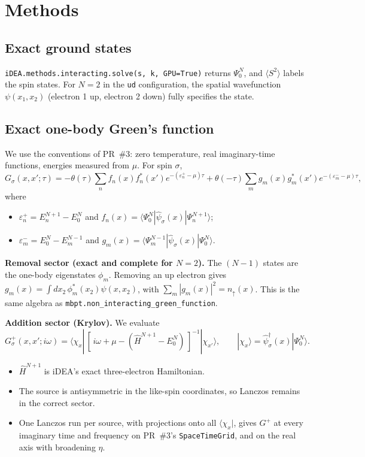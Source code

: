 \documentclass[11pt,a4paper]{article}
\newcommand{\iDEA}{iDEA}
\newcommand{\code}[1]{\texttt{#1}}
\begin{document}
\section{Methods}

\subsection{Exact ground states}
\code{iDEA.methods.interacting.solve(s, k, GPU=True)} returns $\Psi_0^N$, and $\langle S^2\rangle$ labels the spin states. For $N=2$ in the \code{ud} configuration, the spatial wavefunction $\psi(x_1,x_2)$ (electron 1 up, electron 2 down) fully specifies the state.

\subsection{Exact one-body Green's function}
We use the conventions of PR~\#3: zero temperature, real imaginary-time functions, energies measured from $\mu$. For spin $\sigma$,
\begin{equation}
G_\sigma(x,x';\tau)=-\theta(\tau)\sum_n f_n(x)f_n^*(x')e^{-(\varepsilon_n^+-\mu)\tau}+\theta(-\tau)\sum_m g_m(x)g_m^*(x')e^{-(\varepsilon_m^--\mu)\tau},
\end{equation}
where
\begin{itemize}
\item $\varepsilon_n^+=E_n^{N+1}-E_0^N$ and $f_n(x)=\langle\Psi_0^N|\hat\psi_\sigma(x)|\Psi_n^{N+1}\rangle$;
\item $\varepsilon_m^-=E_0^N-E_m^{N-1}$ and $g_m(x)=\langle\Psi_m^{N-1}|\hat\psi_\sigma(x)|\Psi_0^N\rangle$.
\end{itemize}

\textbf{Removal sector (exact and complete for $N=2$).} The $(N-1)$ states are the one-body eigenstates $\phi_m$. Removing an up electron gives $g_m(x)=\int dx_2\,\phi_m^*(x_2)\psi(x,x_2)$, with $\sum_m|g_m(x)|^2=n_\uparrow(x)$. This is the same algebra as \code{mbpt.non\_interacting\_green\_function}.

\textbf{Addition sector (Krylov).} We evaluate
\begin{equation}
G^+_\sigma(x,x';i\omega)=\langle\chi_x|\,[\,i\omega+\mu-(\hat H^{N+1}-E_0^N)\,]^{-1}|\chi_{x'}\rangle,\qquad |\chi_x\rangle=\hat\psi^\dagger_\sigma(x)|\Psi_0^N\rangle.
\end{equation}
\begin{itemize}
\item $\hat H^{N+1}$ is \iDEA's exact three-electron Hamiltonian.
\item The source is antisymmetric in the like-spin coordinates, so Lanczos remains in the correct sector.
\item One Lanczos run per source, with projections onto all $\langle\chi_x|$, gives $G^+$ at every imaginary time and frequency on PR~\#3's \code{SpaceTimeGrid}, and on the real axis with broadening $\eta$.
\end{itemize}
\end{document}
